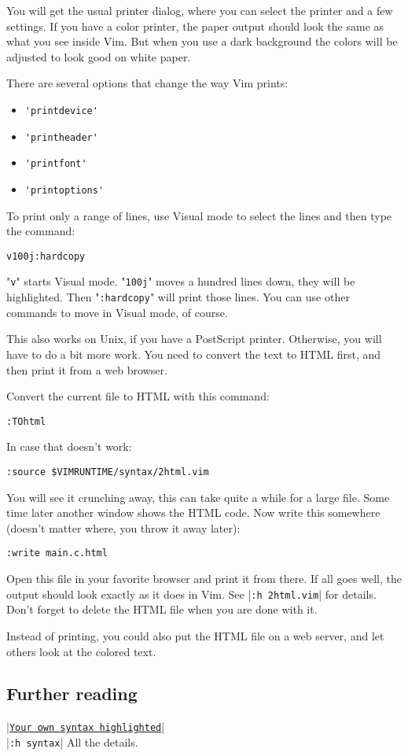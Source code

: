 You will get the usual printer dialog, where you can select the printer and a few settings.
If you have a color printer, the paper output should look the same as what you see inside Vim.
But when you use a dark background the colors will be adjusted to look good on white paper.

There are several options that change the way Vim prints:
\begin{itemize}
				\item \verb!'printdevice'!
				\item \verb!'printheader'!
				\item \verb!'printfont'!
				\item \verb!'printoptions'!
\end{itemize}

To print only a range of lines, use Visual mode to select the lines and then type the command:

 \begin{Verbatim}[samepage=true]
 v100j:hardcopy
 \end{Verbatim}

"\verb!v!" starts Visual mode.
"\verb!100j!" moves a hundred lines down, they will be highlighted.
Then "\verb!:hardcopy!" will print those lines.
You can use other commands to move in Visual mode, of course.

This also works on Unix, if you have a PostScript printer.
Otherwise, you will have to do a bit more work.
You need to convert the text to HTML first, and then print it from a web browser.

Convert the current file to HTML with this command:

 \begin{Verbatim}[samepage=true]
 :TOhtml
 \end{Verbatim}

In case that doesn't work:

 \begin{Verbatim}[samepage=true]
 :source $VIMRUNTIME/syntax/2html.vim
 \end{Verbatim}

You will see it crunching away, this can take quite a while for a large file.
Some time later another window shows the HTML code.
Now write this somewhere (doesn't matter where, you throw it away later):

 \begin{Verbatim}[samepage=true]
 :write main.c.html
 \end{Verbatim}

Open this file in your favorite browser and print it from there.
If all goes well, the output should look exactly as it does in Vim.
See |\verb!:h 2html.vim!| for details.
Don't forget to delete the HTML file when you are done with it.

Instead of printing, you could also put the HTML file on a web server, and let others look at the colored text.

\subsection{Further reading}
|\hyperref[Your own syntax highlighted]{\texttt{Your own syntax highlighted}}|\\
|\verb!:h syntax!|      All the details.

\clearpage
